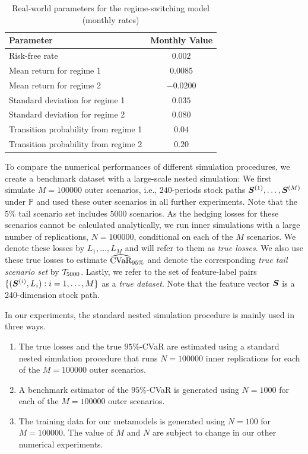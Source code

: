 \begin{table}[ht]
    \centering
    \begin{tabular}{lc}
        \toprule
        \textbf{Parameter}  & \textbf{Monthly Value} \\
        \midrule
        Risk-free rate & $0.002$ \\
        Mean return for regime 1  & $0.0085$ \\
        Mean return for regime 2   & $-0.0200$ \\
        Standard deviation for regime 1  & $0.035$ \\
        Standard deviation for regime 2  & $0.080$ \\
        Transition probability from regime 1  & $0.04$ \\
        Transition probability from regime 2  & $0.20$ \\
        \bottomrule
    \end{tabular}
    \caption{Real-world parameters for the regime-switching model (monthly rates)}
    \label{tab:regime_params}
\end{table}

To compare the numerical performances of different simulation procedures, we create a benchmark dataset with a large-scale nested simulation: We first simulate $M=\num{100000}$ outer scenarios, i.e., $240$-periods stock paths $\bm{S}^{(1)},\ldots,\bm{S}^{(M)}$ under $\mathbb{P}$ and used these outer scenarios in all further experiments.
Note that the $5\%$ tail scenario set includes $\num{5000}$ scenarios.
As the hedging losses for these scenarios cannot be calculated analytically, we run inner simulations with a large number of replications, $N=\num{100000}$, conditional on each of the $M$ scenarios.
We denote these losses by $L_1,\ldots,L_M$ and will refer to them as \textit{true losses}.
We also use these true losses to estimate $\widehat{\mbox{CVaR}}_{95\%}$ and denote the corresponding \textit{true tail scenario set} by $\mathcal{T}_{5000}$.
Lastly, we refer to the set of feature-label pairs $\{(\bm{S}^{(i)}, L_i): i=1,\ldots,M\}$ as a \textit{true dataset}.
Note that the feature vector $\bm{S}$ is a 240-dimension stock path.

In our experiments, the standard nested simulation procedure is mainly used in three ways.
\begin{enumerate}
    \item   The true losses and the true $95\%$-CVaR are estimated using a standard nested simulation procedure that runs $N=\num{100000}$ inner replications for each of the $M=\num{100000}$ outer scenarios.
    \item   A benchmark estimator of the $95\%$-CVaR is generated using $N=\num{1000}$ for each of the $M=\num{100000}$ outer scenarios.
    \item   The training data for our metamodels is generated using $N=\num{100}$ for $M=\num{100000}$.
    The value of $M$ and $N$ are subject to change in our other numerical experiments.
\end{enumerate}

